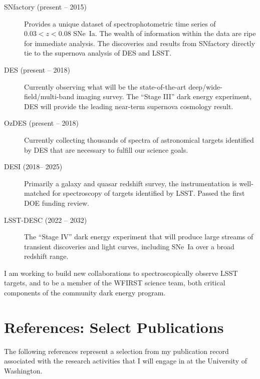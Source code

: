 \documentclass[12pt]{article}
\newcommand{\where}{the University of Washington}
\newcommand{\where}{the University of Michigan}
\begin{document}
\begin{description}
\item[SNfactory (present -- 2015)]  Provides a unique dataset of
spectrophotometric time series of $0.03<z<0.08$ SNe~Ia.  The wealth of information
within the data are ripe for immediate analysis. The discoveries and results from SNfactory directly tie to the supernova
analysis of DES and LSST.
\item[DES (present -- 2018)] Currently observing what will be the state-of-the-art deep/wide-field/multi-band
imaging survey.   The ``Stage III'' dark energy experiment, DES will provide the leading near-term supernova
cosmology result.
\item[OzDES (present -- 2018)] Currently collecting thousands of spectra of astronomical targets identified by DES
that are necessary to fulfill our science goals.
\item[DESI (2018-- 2025)]  Primarily a galaxy and quasar redshift survey, the instrumentation is well-matched for
 spectroscopy of targets identified by LSST. Passed the first DOE funding review.
\item[LSST-DESC (2022 -- 2032)]  The ``Stage IV'' dark energy experiment that will produce large streams of
transient discoveries and light curves, including SNe~Ia over a broad redshift range.
\end{description}

I am working to build new collaborations to
spectroscopically observe LSST targets, and to be a member of the WFIRST science team,
both critical components of the community dark energy program.



\section{References: Select Publications}
The following references represent a selection from my publication record associated with the research
activities that I will engage in at \where{}.



\end{document}
